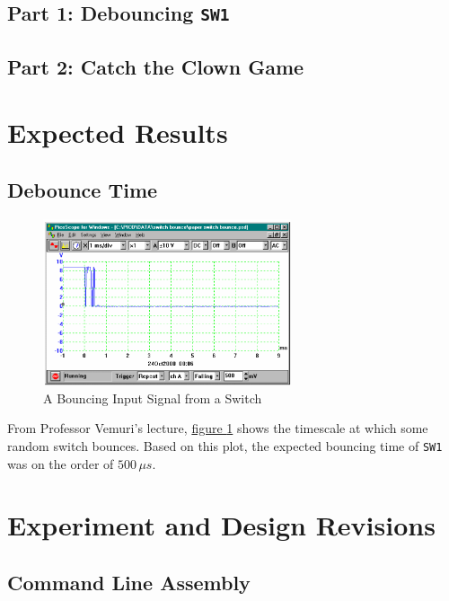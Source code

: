 \documentclass[11pt]{article}
\begin{document}
\subsection{Part 1: Debouncing \texttt{SW1}}

\subsection{Part 2: Catch the Clown Game}

\section{Expected Results}

\subsection{Debounce Time}

\begin{figure}
	\centering
	\includegraphics[width=0.65\textwidth]{Figures/debounce-handout-time-graph.pdf}
	\caption{A Bouncing Input Signal from a Switch}
	\label{debounce-handout-time-graph}
\end{figure}

From Professor Vemuri's lecture,
\hyperref[debounce-handout-time-graph]{figure \ref{debounce-handout-time-graph}}
shows the timescale at which some random switch bounces.
Based on this plot, the expected bouncing time of \texttt{SW1}
was on the order of $500\, \mu s$.

\section{Experiment and Design Revisions}

\subsection{Command Line Assembly}
\end{document}
